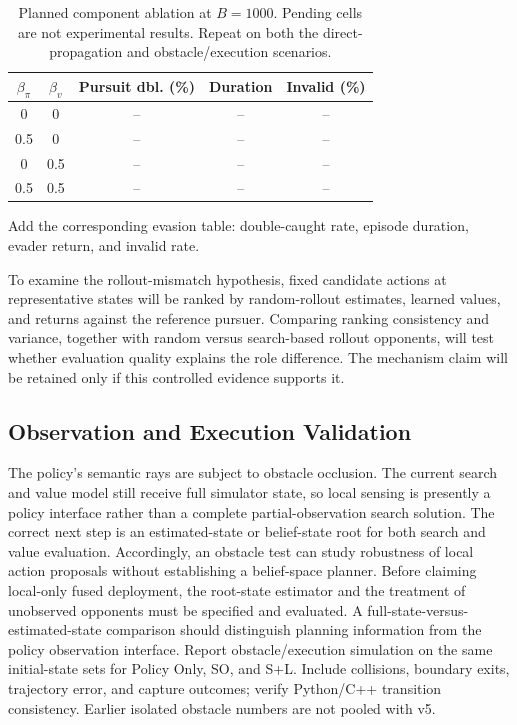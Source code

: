 \documentclass[letterpaper,10pt,conference]{ieeeconf}
\begin{document}
\begin{table}[t]\centering\footnotesize
\caption{Planned component ablation at $B=1000$. Pending cells are not
experimental results. Repeat on both the direct-propagation and
obstacle/execution scenarios.}
\label{tab:beta}
\begin{tabular}{@{}ccccc@{}}\toprule
$\beta_\pi$ & $\beta_v$ & Pursuit dbl. (\%) & Duration & Invalid (\%)\\
\midrule
0 & 0 & -- & -- & --\\
0.5 & 0 & -- & -- & --\\
0 & 0.5 & -- & -- & --\\
0.5 & 0.5 & -- & -- & --\\
\bottomrule\end{tabular}
\end{table}
Add the corresponding evasion table: double-caught rate,
episode duration, evader return, and invalid rate.

To examine the rollout-mismatch hypothesis, fixed candidate actions at
representative states will be ranked by random-rollout estimates,
learned values, and returns against the reference pursuer. Comparing
ranking consistency and variance, together with random versus
search-based rollout opponents, will test whether evaluation quality
explains the role difference. The mechanism claim will be retained only
if this controlled evidence supports it.

\subsection{Observation and Execution Validation}

The policy's semantic rays are subject to obstacle occlusion. The
current search and value model still receive full simulator state, so
local sensing is presently a policy interface rather than a complete
partial-observation search solution. The correct next step is an
estimated-state or belief-state root for both search and value evaluation.
Accordingly, an obstacle test can study robustness of local action
proposals without establishing a belief-space planner. Before claiming
local-only fused deployment, the root-state estimator and the treatment
of unobserved opponents must be specified and evaluated. A
full-state-versus-estimated-state comparison should distinguish planning
information from the policy observation interface.
Report obstacle/execution simulation on the same initial-state
sets for Policy Only, SO, and S+L. Include collisions, boundary exits,
trajectory error, and capture outcomes; verify Python/C++ transition
consistency. Earlier isolated obstacle numbers are not pooled with v5.
\end{document}
